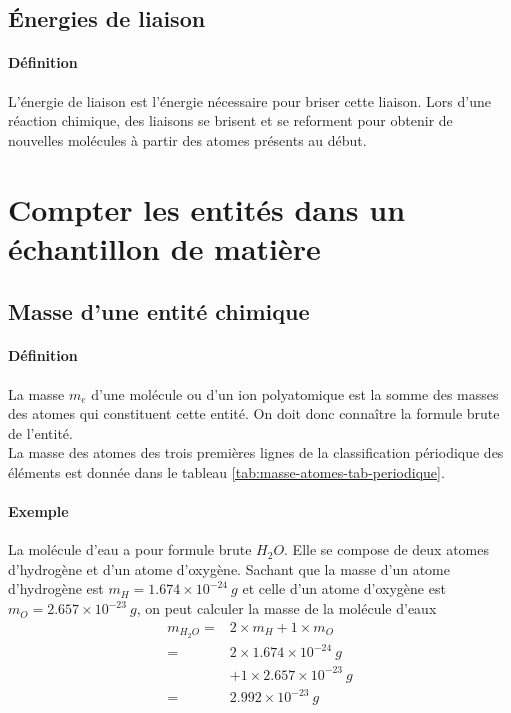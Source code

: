 \subsection{Énergies de liaison}
\paragraph{Définition} L'énergie de liaison est l'énergie nécessaire pour briser cette liaison. Lors d'une réaction chimique, des liaisons se brisent et 
se reforment pour obtenir de nouvelles molécules à partir des atomes présents au début.

\section{Compter les entités dans un échantillon de matière}
\subsection{Masse d'une entité chimique} 
\paragraph{Définition} La masse $m_e$ d'une molécule ou d'un ion polyatomique est la somme des masses des atomes qui constituent cette entité. On doit donc connaître la formule brute de l'entité.\\ La masse des atomes des trois premières lignes de la classification périodique des éléments est donnée dans le tableau \ref{tab:masse-atomes-tab-periodique}.

\paragraph{Exemple} La molécule d'eau a pour formule brute $H_2O$. Elle se compose de deux atomes d'hydrogène et d'un atome d'oxygène. Sachant que la masse d'un atome d'hydrogène est $m_H =  1.674 \times 10^{-24}~g$ et celle d'un atome d'oxygène est 
$m_O =  2.657 \times 10^{-23}~g$, on peut calculer la masse de la molécule d'eaux
\begin{equation*}
    \begin{aligned}
      m_{H_2O} =&  2 \times m_H + 1 \times m_O \\
		=& 2 \times 1.674 \times 10^{-24}~g \\
		&+ 1 \times 2.657 \times 10^{-23}~g \\
		 =& 2.992 \times 10^{-23}~g     
    \end{aligned}
\end{equation*}

